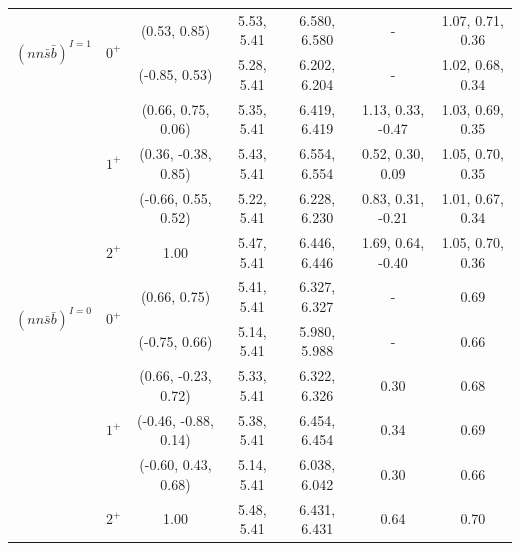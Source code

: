 \documentclass[prd,twocolumn,floatfix,nofootinbib]{revtex4}
\begin{document}
\begin{table}[!htbp]
\begin{tabular}{ccccccc}
        \multirow{2}{*}{${(nn\bar{s}\bar{b})}^{I=1}$}
                        &\multirow{2}{*}{$0^{+}$}
                                    &(0.53, 0.85)           &5.53, 5.41	    &6.580, 6.580	    &-                      &1.07, 0.71, 0.36 \\
                        &           &(-0.85, 0.53)          &5.28, 5.41	    &6.202, 6.204	    &-                      &1.02, 0.68, 0.34 \\
                        &\multirow{3}{*}{$1^{+}$}
                                    &(0.66, 0.75, 0.06)     &5.35, 5.41	    &6.419, 6.419	    &1.13, 0.33, -0.47      &1.03, 0.69, 0.35 \\
                        &           &(0.36, -0.38, 0.85)    &5.43, 5.41	    &6.554, 6.554	    &0.52, 0.30, 0.09       &1.05, 0.70, 0.35 \\
                        &           &(-0.66, 0.55, 0.52)    &5.22, 5.41	    &6.228, 6.230	    &0.83, 0.31, -0.21      &1.01, 0.67, 0.34 \\
                        &$2^{+}$    &1.00                   &5.47, 5.41	    &6.446, 6.446	    &1.69, 0.64, -0.40      &1.05, 0.70, 0.36 \\
        \multirow{2}{*}{${(nn\bar{s}\bar{b})}^{I=0}$}
                        &\multirow{2}{*}{$0^{+}$}
                                    &(0.66, 0.75)           &5.41, 5.41	    &6.327, 6.327	    &-                      &0.69 \\
                        &           &(-0.75, 0.66)          &5.14, 5.41	    &5.980, 5.988	    &-                      &0.66 \\
                        &\multirow{3}{*}{$1^{+}$}
                                    &(0.66, -0.23, 0.72)    &5.33, 5.41	    &6.322, 6.326	    &0.30                   &0.68 \\
                        &           &(-0.46, -0.88, 0.14)   &5.38, 5.41	    &6.454, 6.454	    &0.34                   &0.69 \\
                        &           &(-0.60, 0.43, 0.68)    &5.14, 5.41	    &6.038, 6.042	    &0.30                   &0.66 \\
                        &$2^{+}$    &1.00                   &5.48, 5.41	    &6.431, 6.431	    &0.64                   &0.70 \\
        \hline\hline
    \end{tabular}
\end{table}
\end{document}
